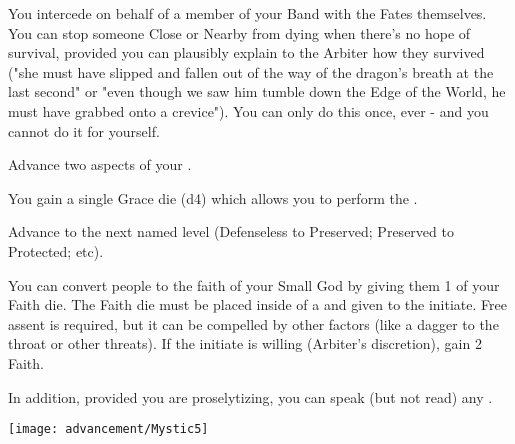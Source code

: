 \begin{multicols*}{2}

You intercede on behalf of a member of your Band with the Fates themselves.  You can stop someone Close or Nearby from dying when there's no hope of survival, provided you can plausibly explain to the Arbiter how they survived ("she must have slipped and fallen out of the way of the dragon's breath at the last second" or "even though we saw him tumble down the Edge of the World, he must have grabbed onto a crevice").  You can only do this once, ever - and you cannot do it for yourself. 


Advance two  aspects of your  \DCUP.



You gain a single Grace die (d4) which allows you to perform the .


Advance   to the next named level (Defenseless to Preserved; Preserved to Protected; etc).


You can convert people to the faith of your Small God by giving them 1 of your Faith die.  The Faith die must be placed inside of a  and given to the initiate. Free assent is required, but it can be compelled by other factors (like a dagger to the throat or other threats). If the initiate is willing (Arbiter's discretion), gain 2 Faith.

In addition, provided you are proselytizing, you can speak (but not read) any .

\end{multicols*}

\newpage

\begin{center}
\texttt{[image: advancement/Mystic5]}
\end{center}

